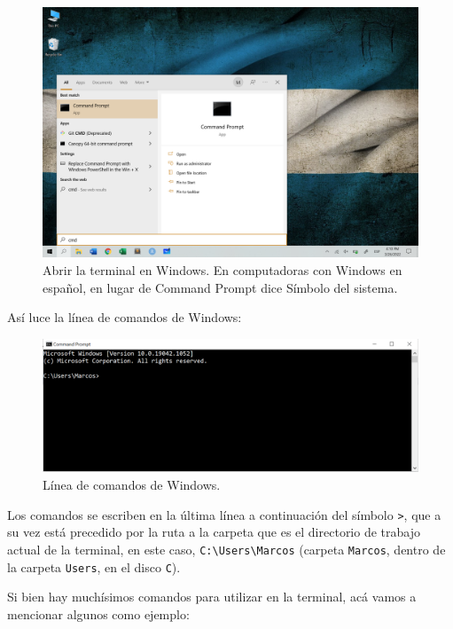 \documentclass[
]{book}
\begin{document}
\begin{figure}

{\centering \includegraphics[width=0.8\linewidth]{images/07_otros/terminal} 

}

\caption{Abrir la terminal en Windows. En computadoras con Windows en español, en lugar de Command Prompt dice Símbolo del sistema.}\label{fig:unnamed-chunk-175}
\end{figure}

Así luce la línea de comandos de Windows:

\begin{figure}

{\centering \includegraphics[width=0.8\linewidth]{images/07_otros/terminal2} 

}

\caption{Línea de comandos de Windows.}\label{fig:unnamed-chunk-176}
\end{figure}

Los comandos se escriben en la última línea a continuación del símbolo \texttt{\textgreater{}}, que a su vez está precedido por la ruta a la carpeta que es el directorio de trabajo actual de la terminal, en este caso, \texttt{C:\textbackslash{}Users\textbackslash{}Marcos} (carpeta \texttt{Marcos}, dentro de la carpeta \texttt{Users}, en el disco \texttt{C}).

Si bien hay muchísimos comandos para utilizar en la terminal, acá vamos a mencionar algunos como ejemplo:
\end{document}
